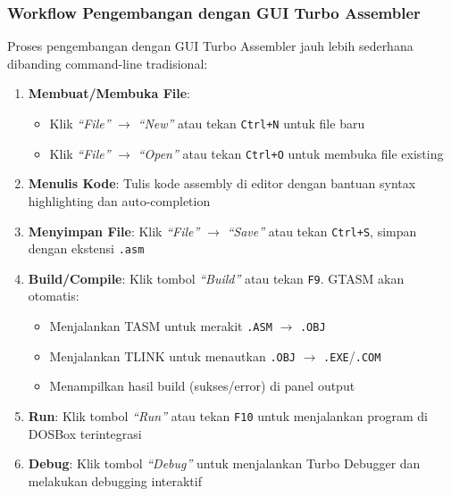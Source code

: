 \documentclass[../main.tex]{subfiles}
\begin{document}
            \subsubsection{Workflow Pengembangan dengan GUI Turbo Assembler}
Proses pengembangan dengan GUI Turbo Assembler jauh lebih sederhana dibanding command-line tradisional:

\begin{enumerate}
    \item \textbf{Membuat/Membuka File}:
    \begin{itemize}
        \item Klik \textit{``File''} $\rightarrow$ \textit{``New''} atau tekan \texttt{Ctrl+N} untuk file baru
        \item Klik \textit{``File''} $\rightarrow$ \textit{``Open''} atau tekan \texttt{Ctrl+O} untuk membuka file existing
    \end{itemize}
    
    \item \textbf{Menulis Kode}: Tulis kode assembly di editor dengan bantuan syntax highlighting dan auto-completion
    
    \item \textbf{Menyimpan File}: Klik \textit{``File''} $\rightarrow$ \textit{``Save''} atau tekan \texttt{Ctrl+S}, simpan dengan ekstensi \texttt{.asm}
    
    \item \textbf{Build/Compile}: Klik tombol \textit{``Build''} atau tekan \texttt{F9}. GTASM akan otomatis:
    \begin{itemize}
        \item Menjalankan TASM untuk merakit \texttt{.ASM} $\rightarrow$ \texttt{.OBJ}
        \item Menjalankan TLINK untuk menautkan \texttt{.OBJ} $\rightarrow$ \texttt{.EXE}/\texttt{.COM}
        \item Menampilkan hasil build (sukses/error) di panel output
    \end{itemize}
    
    \item \textbf{Run}: Klik tombol \textit{``Run''} atau tekan \texttt{F10} untuk menjalankan program di DOSBox terintegrasi
    
    \item \textbf{Debug}: Klik tombol \textit{``Debug''} untuk menjalankan Turbo Debugger dan melakukan debugging interaktif
\end{enumerate}
\end{document}
